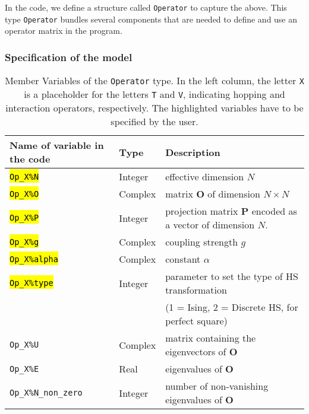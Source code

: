 In the code, we define a structure called \texttt{Operator} to capture the above. 
This type \texttt{Operator} bundles several components that are needed to define and use an operator matrix in the program.  

\subsubsection{Specification of the model}\label{sec:specific}
%
\begin{table}[h]
   \begin{tabular}{l l l}
    Name of variable in the code & Type & Description \\\hline
    \hl{\texttt{Op\_X\%N}}       & Integer     &  effective dimension $N$ \\
    \hl{\texttt{Op\_X\%O}}       & Complex    &  matrix  $\mathbf{O}$  of dimension $N \times N$\\
    \hl{\texttt{Op\_X\%P}}       & Integer   &  projection matrix $\mathbf{P}$  encoded as a vector of dimension $N$.\\
    \hl{\texttt{Op\_X\%g}}       & Complex    &  coupling strength $g$ \\  
    \hl{\texttt{Op\_X\%alpha}}   & Complex  &  constant $\alpha$ \\
    \hl{\texttt{Op\_X\%type}}    & Integer   &  parameter to set the type of 
                                             HS transformation\\
                             &   &  (1 = Ising, 2 = Discrete HS, for perfect square)  \\ 
    \texttt{Op\_X\%U}            & Complex &  matrix containing the eigenvectors of $\mathbf{O}$  \\
    \texttt{Op\_X\%E}            & Real &  eigenvalues of $\mathbf{O}$ \\
    \texttt{Op\_X\%N\_non\_zero} & Integer &  number of non-vanishing eigenvalues of $\mathbf{O}$ 
   \end{tabular}
   \caption{Member Variables of the \texttt{Operator}  type. 
   In the left column, the letter \texttt{X} is a placeholder for the letters \texttt{T} and \texttt{V}, 
   indicating hopping and interaction operators, respectively.
   The highlighted variables have to be specified by the user. 
    \label{table:operator}}
\end{table}
